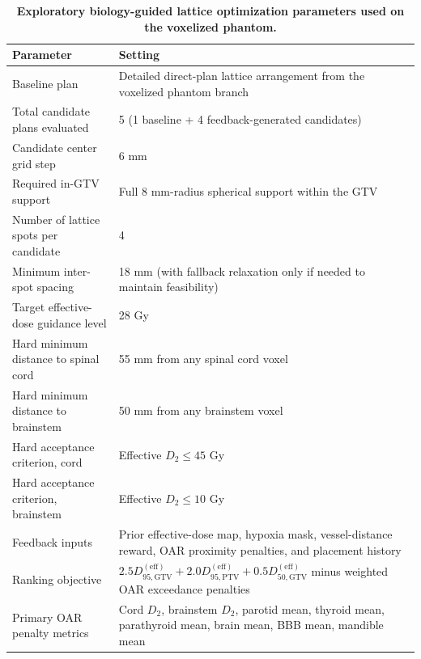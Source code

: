 \begin{table}[H]
\centering
\caption{\textbf{Exploratory biology-guided lattice optimization parameters used on the voxelized phantom.}}
\label{tab:bioopt_parameters}
\small
\begin{tabular}{p{5.4cm}p{7.2cm}}
\toprule
Parameter & Setting \\
\midrule
Baseline plan & Detailed direct-plan lattice arrangement from the voxelized phantom branch \\
Total candidate plans evaluated & 5 (1 baseline + 4 feedback-generated candidates) \\
Candidate center grid step & 6 mm \\
Required in-GTV support & Full 8 mm-radius spherical support within the GTV \\
Number of lattice spots per candidate & 4 \\
Minimum inter-spot spacing & 18 mm (with fallback relaxation only if needed to maintain feasibility) \\
Target effective-dose guidance level & 28 Gy \\
Hard minimum distance to spinal cord & 55 mm from any spinal cord voxel \\
Hard minimum distance to brainstem & 50 mm from any brainstem voxel \\
Hard acceptance criterion, cord & Effective $D_{2} \leq 45$ Gy \\
Hard acceptance criterion, brainstem & Effective $D_{2} \leq 10$ Gy \\
Feedback inputs & Prior effective-dose map, hypoxia mask, vessel-distance reward, OAR proximity penalties, and placement history \\
Ranking objective & $2.5D_{95,\mathrm{GTV}}^{(\mathrm{eff})} + 2.0D_{95,\mathrm{PTV}}^{(\mathrm{eff})} + 0.5D_{50,\mathrm{GTV}}^{(\mathrm{eff})}$ minus weighted OAR exceedance penalties \\
Primary OAR penalty metrics & Cord $D_{2}$, brainstem $D_{2}$, parotid mean, thyroid mean, parathyroid mean, brain mean, BBB mean, mandible mean \\
\bottomrule
\end{tabular}
\end{table}
